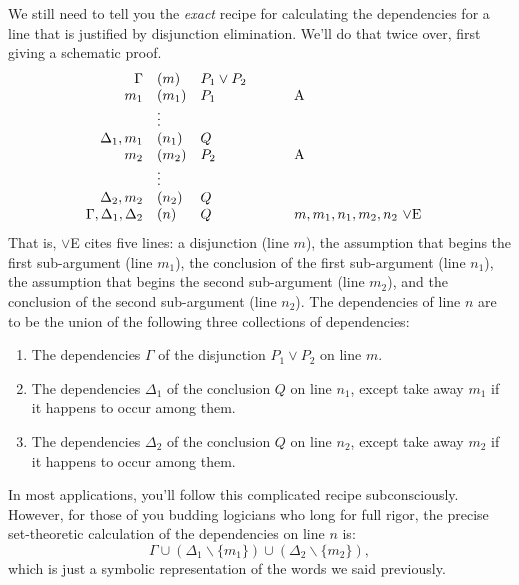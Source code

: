 We still need to tell you the {\it exact} recipe for calculating the
dependencies for a line that is justified by disjunction elimination.
We'll do that twice over, first giving a schematic proof.
\[ \begin{array}{r l >{$}p{2cm}<{$} p{3.5cm}}
    \Gamma    & (m)         & P_1\vee P_2 & \\
    m_1       & (m_1)       & P_1         & A \\
    &  \vdots     & \\
    \Delta _1,m_1    & (n_1) & Q   & \\
    m_2       & (m_2) & P_2 & A  \\
    & \vdots \\
    \Delta _2,m_2  & (n_2) & Q     \\
    \Gamma ,\Delta _1,\Delta _2 & (n) & Q &
    $m,m_1,n_1,m_2,n_2$ $\vee$E \end{array} \] That is, $\vee$E cites
five lines: a disjunction (line $m$), the assumption that begins the
first sub-argument (line $m_1$), the conclusion of the first
sub-argument (line $n_1$), the assumption that begins the second
sub-argument (line $m_2$), and the conclusion of the second
sub-argument (line $n_2$).  The dependencies of line $n$ are to be the
union of the following three collections of dependencies:
\begin{enumerate}
\item The dependencies $\Gamma$ of the disjunction $P_1\vee P_2$ on
  line $m$.
\item The dependencies $\Delta _1$ of the conclusion $Q$ on line
  $n_1$, except take away $m_1$ if it happens to occur among them.
\item The dependencies $\Delta _2$ of the conclusion $Q$ on line
  $n_2$, except take away $m_2$ if it happens to occur among them.
\end{enumerate}
In most applications, you'll follow this complicated recipe
subconsciously.  However, for those of you budding logicians who long
for full rigor, the precise set-theoretic calculation of the
dependencies on line $n$ is:
\[ \Gamma \cup (\Delta _1\backslash \{ m_1\})\cup (\Delta _2\backslash
  \{ m_2\}) ,\] which is just a symbolic representation of the words
we said previously.

